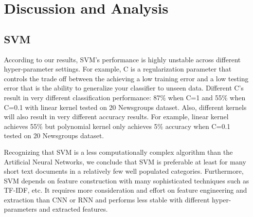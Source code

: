 \documentclass{article}
\begin{document}

\section{Discussion and Analysis}
\subsection{SVM}
According to our results, SVM’s performance is highly unstable across different hyper-parameter settings.  For example, C is a regularization parameter that controls the trade off between the achieving a low training error and a low testing error that is the ability to generalize your classifier to unseen data. Different C’s result in very different classification performance: 87\% when C=1 and 55\% when C=0.1 with linear kernel tested on 20 Newsgroups dataset.  Also, different kernels will also result in very different accuracy results. For example, linear kernel achieves 55\% but polynomial kernel only achieves 5\% accuracy when C=0.1 tested on 20 Newsgroups dataset.

Recognizing that SVM is a less computationally complex algorithm than the Artificial Neural Networks, we conclude that SVM is preferable at least for many short text documents in a relatively few well populated categories. Furthermore, SVM depends on feature construction with many sophisticated techniques such as TF-IDF, etc. It requires more consideration and effort on feature engineering and extraction than CNN or RNN and performs less stable with different hyper-parameters and extracted features.
\end{document}
